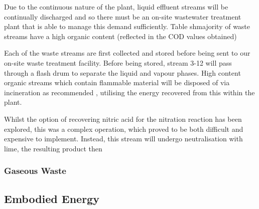 Due to the continuous nature of the plant, liquid effluent streams will be continually discharged and so there must be an on-site wastewater treatment plant that is able to manage this demand sufficiently. Table %
shmajority of waste streams have a high organic content (reflected in the COD values obtained) 

Each of the waste streams are first collected and stored before being sent to our on-site waste treatment facility. Before being stored, stream 3-12 will pass through a flash drum to separate the liquid and vapour phases. High content organic streams which contain flammable material will be disposed of via incineration as recommended \cite{sinnott_coulson_2005}, utilising the energy recovered from this within the plant. %

Whilst the option of recovering nitric acid for the nitration reaction has been explored, this was a complex operation, which proved to be both difficult and expensive to implement. Instead, this stream will undergo neutralisation with lime, the resulting product then 













\subsubsection{Gaseous Waste}

\subsection{Embodied Energy}
